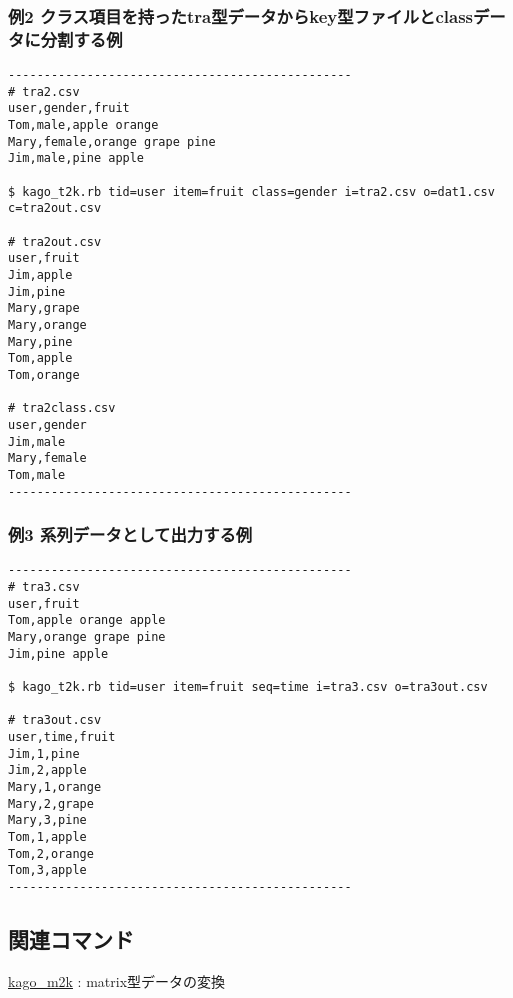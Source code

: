 \documentclass[a4paper]{jarticle}
\begin{document}
\subsubsection*{例2 クラス項目を持ったtra型データからkey型ファイルとclassデータに分割する例}

\begin{verbatim}
------------------------------------------------
# tra2.csv
user,gender,fruit
Tom,male,apple orange
Mary,female,orange grape pine
Jim,male,pine apple

$ kago_t2k.rb tid=user item=fruit class=gender i=tra2.csv o=dat1.csv c=tra2out.csv

# tra2out.csv
user,fruit
Jim,apple
Jim,pine
Mary,grape
Mary,orange
Mary,pine
Tom,apple
Tom,orange

# tra2class.csv
user,gender
Jim,male
Mary,female
Tom,male
------------------------------------------------
\end{verbatim}

\subsubsection*{例3 系列データとして出力する例}

\begin{verbatim}
------------------------------------------------
# tra3.csv
user,fruit
Tom,apple orange apple
Mary,orange grape pine
Jim,pine apple

$ kago_t2k.rb tid=user item=fruit seq=time i=tra3.csv o=tra3out.csv

# tra3out.csv
user,time,fruit
Jim,1,pine
Jim,2,apple
Mary,1,orange
Mary,2,grape
Mary,3,pine
Tom,1,apple
Tom,2,orange
Tom,3,apple
------------------------------------------------
\end{verbatim}

\subsection*{関連コマンド}

\hyperlink{kago\_m2k.pdf}{kago\_m2k} : matrix型データの変換
\end{document}

